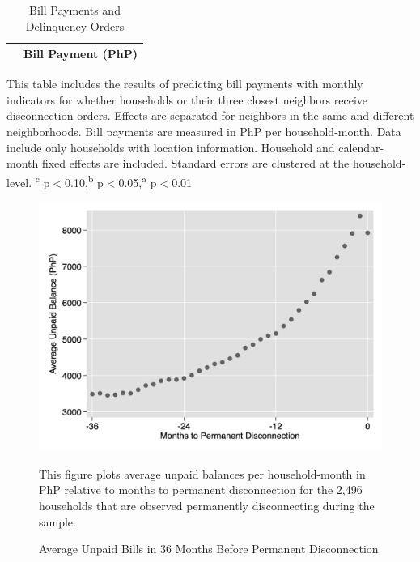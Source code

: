 \documentclass[12pt,table]{article}
\begin{document}
\begin{table}[!ht]
\small
\centering
\begin{threeparttable}
\caption{Bill Payments and Delinquency Orders}\label{table:paywarning}
\vspace{-2mm}
\begin{tabular}{lc}
\toprule
 & \small Bill Payment (PhP) \\[.5em]
 \toprule

\bottomrule
\end{tabular}
\begin{tablenotes}
\footnotesize
\item This table includes the results of predicting bill payments with monthly indicators for whether households or their three closest neighbors receive disconnection orders.  Effects are separated for neighbors in the same and different neighborhoods.  Bill payments are measured in PhP per household-month.  Data include only households with location information.  Household and calendar-month fixed effects are included. Standard errors are clustered at the household-level.  \textsuperscript{c} p$<$0.10,\textsuperscript{b} p$<$0.05,\textsuperscript{a} p$<$0.01 
\end{tablenotes}
\end{threeparttable}
\end{table}

\pagebreak



\begin{figure}[!ht]
\caption{Average Unpaid Bills in 36 Months Before Permanent Disconnection}\label{figure:billtodc}
\begin{center}
\includegraphics[scale=.4]{tables/pay_to_dc_graph.png}
\end{center}
\footnotesize 
This figure plots average unpaid balances per household-month in PhP relative to months to permanent disconnection for the 2,496 households that are observed permanently disconnecting during the sample.
\end{figure}
\end{document}

